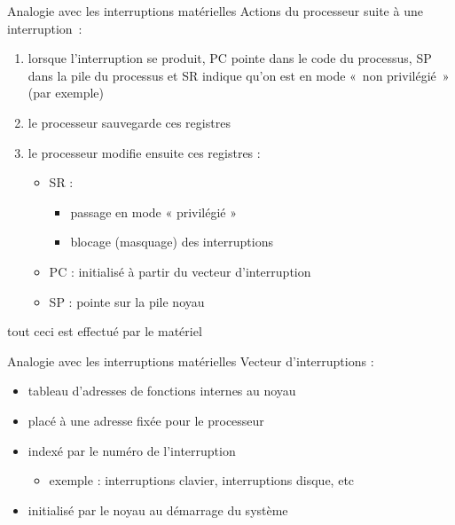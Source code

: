 \begin {frame} {Analogie avec les interruptions matérielles}
    Actions du processeur suite à une interruption~:
    \begin {enumerate}
	\item lorsque l'interruption se produit, PC pointe dans le code du
	    processus, SP dans la pile du processus et SR indique qu'on
	    est en mode «~non privilégié~» (par exemple)

	\item le processeur sauvegarde ces registres

	\item le processeur modifie ensuite ces registres :
	    \begin {itemize}
		\item SR :
		    \begin {itemize}
			\item passage en mode « privilégié »
			\item blocage (masquage) des interruptions
		    \end {itemize}

		\item PC : initialisé à partir du vecteur d'interruption

		\item SP : pointe sur la pile noyau
	    \end {itemize}

    \end {enumerate}

    \vspace* {2mm}

    \implique tout ceci est effectué par le matériel
\end {frame}

\begin {frame} {Analogie avec les interruptions matérielles}
    Vecteur d'interruptions :

    \begin {itemize}
	\item tableau d'adresses de fonctions internes au noyau
	\item placé à une adresse fixée pour le processeur
	\item indexé par le numéro de l'interruption
	    \begin {itemize}
		\item exemple : interruptions clavier,
		    interruptions disque, etc
	    \end {itemize}
	\item initialisé par le noyau au démarrage du système
    \end {itemize}

\end {frame}

